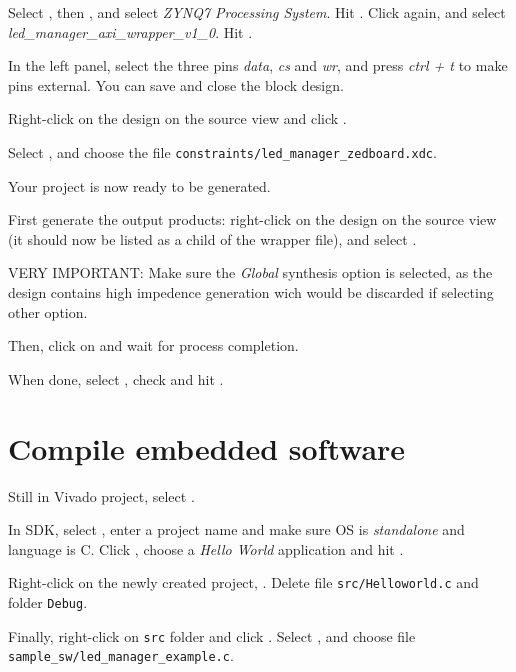 \documentclass[openany,a4paper]{book}
\begin{document}
Select , then , and select \textit{ZYNQ7 Processing System}.
Hit .
Click  again, and select \textit{led\_manager\_axi\_wrapper\_v1\_0}.
Hit .

In the left panel, select the three pins \textit{data}, \textit{cs} and \textit{wr}, and press \textit{ctrl + t} to make pins external.
You can save and close the block design.

Right-click on the design on the source view and click .

Select , and choose the file \texttt{constraints/led\_manager\_zedboard.xdc}.

Your project is now ready to be generated.

First generate the output products: right-click on the design on the source view (it should now be listed as a child of the wrapper file), and select .

VERY IMPORTANT: Make sure the \textit{Global} synthesis option is selected, as the design contains high impedence generation wich would be discarded if selecting other option.

Then, click on  and wait for process completion.

When done, select , check  and hit .

\section{Compile embedded software}

Still in Vivado project, select .

In SDK, select , enter a project name and make sure OS is \textit{standalone} and language is C.
Click , choose a \textit{Hello World} application and hit .

Right-click on the newly created project, .
Delete file \texttt{src/Helloworld.c} and folder \texttt{Debug}.

Finally, right-click on \texttt{src} folder and click .
Select , and choose file \texttt{sample\_sw/led\_manager\_example.c}.
\end{document}
